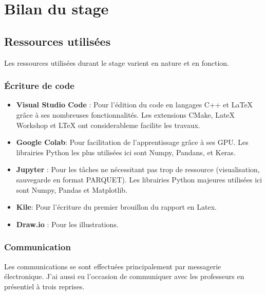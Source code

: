 
\chapter{Bilan du stage} %

\label{Chapter5} %


\section{Ressources utilisées}

Les ressources utilisées durant le stage varient en nature et en fonction.

\subsection{Écriture de code}
\begin{itemize}
 \item \textbf{Visual Studio Code} : Pour l'édition du code en langages C++ et LaTeX grâce à ses nombreuses fonctionnalités. Les extensions CMake, LateX Workshop et LTeX ont considerableme facilite les travaux.
 \item \textbf{Google Colab}: Pour facilitation de l'apprentissage grâce à ses GPU. Les librairies Python les plus utilisées ici sont Numpy, Pandans, et Keras.
 \item \textbf{Jupyter} : Pour les tâches ne nécessitant pas trop de ressource (visualisation, sauvegarde en format PARQUET). Les librairies Python majeures utilisées ici sont Numpy, Pandas et Matplotlib.
 \item \textbf{Kile}: Pour l'écriture du premier brouillon du rapport en Latex.
 \item \textbf{Draw.io} : Pour les illustrations.
\end{itemize}


\subsection{Communication}
Les communications se sont effectuées principalement par messagerie électronique. J'ai aussi eu l'occasion de communiquer avec les professeurs en présentiel à trois reprises.


